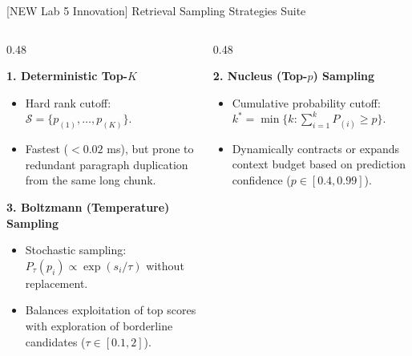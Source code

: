 \documentclass[10pt,aspectratio=169]{beamer}
\begin{document}
\begin{frame}{[NEW Lab 5 Innovation] Retrieval Sampling Strategies Suite}
    \begin{columns}[onlytextwidth,T]
        \begin{column}{0.48\textwidth}
            \begin{block}{\textbf{1. Deterministic Top-$K$}}
                \scriptsize
                \begin{itemize}\setlength\itemsep{1.5pt}
                    \item Hard rank cutoff: $\mathcal{S} = \{p_{(1)}, \dots, p_{(K)}\}$.
                    \item Fastest ($<0.02$ ms), but prone to redundant paragraph duplication from the same long chunk.
                \end{itemize}
            \end{block}
            
            \vspace{0.12cm}
            \begin{block}{\textbf{3. Boltzmann (Temperature) Sampling}}
                \scriptsize
                \begin{itemize}\setlength\itemsep{1.5pt}
                    \item Stochastic sampling: $P_\tau(p_i) \propto \exp(s_i / \tau)$ without replacement.
                    \item Balances exploitation of top scores with exploration of borderline candidates ($\tau \in [0.1, 2]$).
                \end{itemize}
            \end{block}
        \end{column}
        
        \begin{column}{0.48\textwidth}
            \begin{block}{\textbf{2. Nucleus (Top-$p$) Sampling}}
                \scriptsize
                \begin{itemize}\setlength\itemsep{1.5pt}
                    \item Cumulative probability cutoff: $k^* = \min \{ k : \sum_{i=1}^k P_{(i)} \ge p \}$.
                    \item Dynamically contracts or expands context budget based on prediction confidence ($p \in [0.4, 0.99]$).
                \end{itemize}
            \end{block}
            

\end{column}
\end{columns}
\end{frame}
\end{document}

